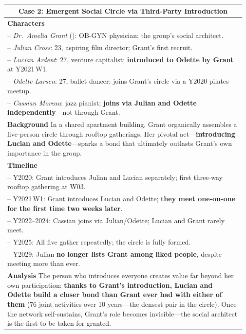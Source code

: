 \begin{table}[htbp]
\begin{tabular}{p{0.97\linewidth}}
\multicolumn{1}{c}{\textbf{Case 2: Emergent Social Circle via Third-Party Introduction}}\\
\midrule
\textbf{Characters}\\
\quad -- \textit{Dr.\ Amelia Grant} (\apartment{}): OB-GYN physician; the group's social architect.\\
\quad -- \textit{Julian Cross}: 23, aspiring film director; Grant's first recruit.\\
\quad -- \textit{Lucian Ardent}: 27, venture capitalist;
  \textbf{introduced to Odette by Grant} at Y2021\,W1.\\
\quad -- \textit{Odette Larsen}: 27, ballet dancer;
  joins Grant's circle via a Y2020 pilates meetup.\\
\quad -- \textit{Cassian Moreau}: jazz pianist;
  \textbf{joins via Julian and Odette independently}---not through Grant.\\[2pt]
\textbf{Background}\quad
In a shared apartment building, Grant organically assembles a five-person circle
through rooftop gatherings.
Her pivotal act---\textbf{introducing Lucian and Odette}---sparks a bond that ultimately
outlasts Grant's own importance in the group.\\[2pt]
\textbf{Timeline}\\
\quad -- Y2020: Grant introduces Julian and Lucian separately;
  first three-way rooftop gathering at W03.\\
\quad -- Y2021\,W1: Grant introduces Lucian and Odette;
  \textbf{they meet one-on-one for the first time two weeks later}.\\
\quad -- Y2022--2024: Cassian joins via Julian/Odette;
  Lucian and Grant rarely meet.\\
\quad -- Y2025: All five gather repeatedly; the circle is fully formed.\\
\quad -- Y2029: Julian \textbf{no longer lists Grant among liked people},
  despite meeting more than ever.\\[2pt]
\textbf{Analysis}\quad
The person who introduces everyone creates value far beyond her own participation:
\textbf{thanks to Grant's introduction, Lucian and Odette build a closer bond than Grant
ever had with either of them} (76 joint activities over 10 years---the densest pair in the circle).
Once the network self-sustains, Grant's role becomes invisible---the social architect
is the first to be taken for granted.\\

\midrule


\end{tabular}
\end{table}
